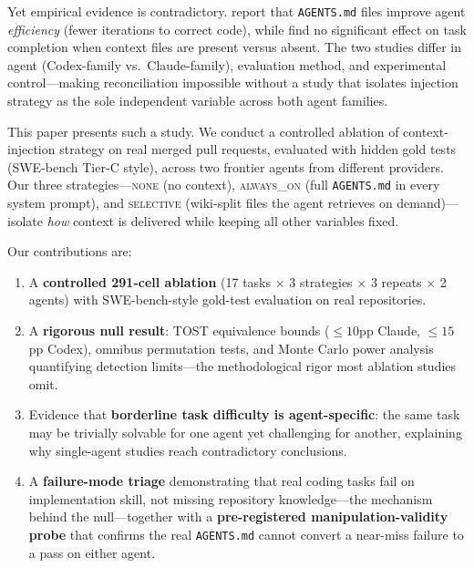 \documentclass[11pt]{article}
\newcommand{\agentsmd}{\texttt{AGENTS.md}}
\newcommand{\none}{\textsc{none}}
\newcommand{\alwayson}{\textsc{always\_on}}
\newcommand{\selective}{\textsc{selective}}
\begin{document}
Yet empirical evidence is contradictory.
\citet{paper1} report that \agentsmd{} files improve agent \emph{efficiency} (fewer iterations to correct code), while \citet{paper2} find no significant effect on task completion when context files are present versus absent.
The two studies differ in agent (Codex-family vs.\ Claude-family), evaluation method, and experimental control---making reconciliation impossible without a study that isolates injection strategy as the sole independent variable across both agent families.

This paper presents such a study.
We conduct a controlled ablation of context-injection strategy on real merged pull requests, evaluated with hidden gold tests (SWE-bench Tier-C style), across two frontier agents from different providers.
Our three strategies---\none{} (no context), \alwayson{} (full \agentsmd{} in every system prompt), and \selective{} (wiki-split files the agent retrieves on demand)---isolate \emph{how} context is delivered while keeping all other variables fixed.

Our contributions are:
\begin{enumerate}
    \item A \textbf{controlled 291-cell ablation} (17 tasks $\times$ 3 strategies $\times$ 3 repeats $\times$ 2 agents) with SWE-bench-style gold-test evaluation on real repositories.
    \item A \textbf{rigorous null result}: TOST equivalence bounds (${\leq}10$pp Claude, ${\leq}15$pp Codex), omnibus permutation tests, and Monte Carlo power analysis quantifying detection limits---the methodological rigor most ablation studies omit.
    \item Evidence that \textbf{borderline task difficulty is agent-specific}: the same task may be trivially solvable for one agent yet challenging for another, explaining why single-agent studies reach contradictory conclusions.
    \item A \textbf{failure-mode triage} demonstrating that real coding tasks fail on implementation skill, not missing repository knowledge---the mechanism behind the null---together with a \textbf{pre-registered manipulation-validity probe} that confirms the real \agentsmd{} cannot convert a near-miss failure to a pass on either agent.
\end{enumerate}

\end{document}
